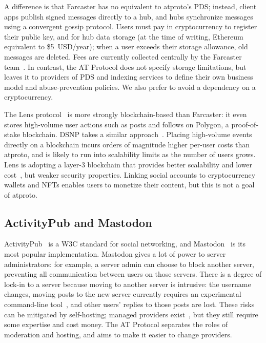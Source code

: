 \documentclass[sigconf]{acmart}
\begin{document}
A difference is that Farcaster has no equivalent to atproto's PDS; instead, client apps publish signed messages directly to a hub, and hubs synchronize messages using a convergent gossip protocol.
Users must pay in cryptocurrency to register their public key, and for hub data storage (at the time of writing, Ethereum equivalent to \$5~USD/year); when a user exceeds their storage allowance, old messages are deleted.
Fees are currently collected centrally by the Farcaster team~\cite{FarcasterFees}.
In contrast, the AT Protocol does not specify storage limitations, but leaves it to providers of PDS and indexing services to define their own business model and abuse-prevention policies.
We also prefer to avoid a dependency on a cryptocurrency.

The Lens protocol~\cite{Lens} is more strongly blockchain-based than Farcaster: it even stores high-volume user actions such as posts and follows on Polygon, a proof-of-stake blockchain.
DSNP takes a similar approach~\cite{DSNP}.
Placing high-volume events directly on a blockchain incurs orders of magnitude higher per-user costs than atproto, and is likely to run into scalability limits as the number of users grows.
Lens is adopting a layer-3 blockchain that provides better scalability and lower cost~\cite{LensMomoka}, but weaker security properties.
Linking social accounts to cryptocurrency wallets and NFTs enables users to monetize their content, but this is not a goal of atproto.

\subsection{ActivityPub and Mastodon}

ActivityPub~\cite{ActivityPub} is a W3C standard for social networking, and Mastodon~\cite{Mastodon} is its most popular implementation.
Mastodon gives a lot of power to server administrators: for example, a server admin can choose to block another server, preventing all communication between users on those servers. %
There is a degree of lock-in to a server because moving to another server is intrusive: the username changes, moving posts to the new server currently requires an experimental command-line tool~\cite{MastodonPostMigration,MastodonContentMover}, and other users' replies to those posts are lost.
These risks can be mitigated by self-hosting; managed providers exist~\cite{MastodonHosting}, but they still require some expertise and cost money.
The AT Protocol separates the roles of moderation and hosting, and aims to make it easier to change providers.
\end{document}
